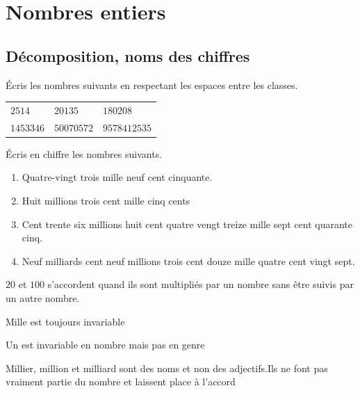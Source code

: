 \documentclass[a4paper,10pt]{report}
\begin{document}

\newpage
\section*{Nombres entiers}

\subsection*{Décomposition, noms des chiffres}

\begin{ex}
Écris les nombres suivants en respectant les espaces entre les classes.

\begin{enumerate}
\begin{tabular}{m{5cm}m{5cm}m{5cm}}
\item $2514$&
\item $20135$&
\item $180208$\\
\item $1453346$&
\item $50070572$&
\item $9578412535$\\
\end{tabular}
\end{enumerate}
\end{ex}

\begin{ex}
Écris en chiffre les nombres suivants.
\begin{enumerate}
\item Quatre-vingt trois mille neuf cent cinquante.
\item Huit millions trois cent mille cinq cents
\item Cent trente six millions huit cent quatre vengt treize mille sept cent quarante cinq.
\item Neuf milliards cent neuf millions trois cent douze mille quatre cent vingt sept.
\end{enumerate}
\end{ex}

\begin{prop}
$20$ et $100$ s'accordent quand ils sont multipliés par un nombre sans être suivis par un autre nombre.

\medskip
\noindent Mille est toujours invariable

\medskip
\noindent Un est invariable en nombre mais pas en genre

\medskip
\noindent Millier, million et milliard sont des noms et non des adjectifs.Ils ne font pas vraiment partie du nombre et laissent place à l'accord 
\end{prop}
\end{document}
